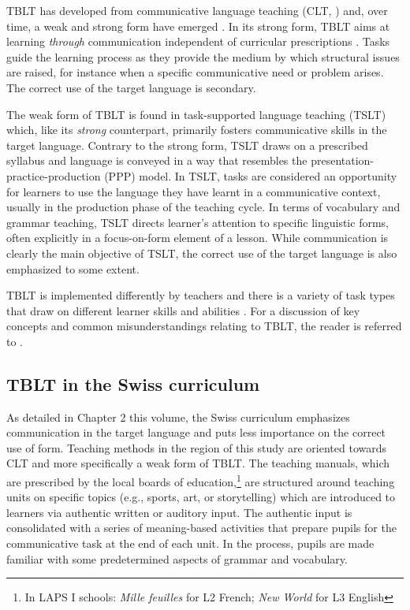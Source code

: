 \documentclass[output=paper]{langsci/langscibook}
\begin{document}
TBLT has developed from communicative language teaching (CLT, \citealt{Krashen1981}) and, over time, a weak and strong form have emerged \citep[109]{Ellis2017}. In its strong form, TBLT aims at learning \textit{through} communication independent of curricular prescriptions \citep{Ellis2017}. Tasks guide the learning process as they provide the medium by which structural issues are raised, for instance when a specific communicative need or problem arises. The correct use of the target language is secondary.

The weak form of TBLT is found in task-supported language teaching (TSLT) which, like its \textit{strong} counterpart, primarily fosters communicative skills in the target language. Contrary to the strong form, TSLT draws on a prescribed syllabus and language is conveyed in a way that resembles the presentation-practice-production (PPP) model. In TSLT, tasks are considered an opportunity for learners to use the language they have learnt in a communicative context, usually in the production phase of the teaching cycle. In terms of vocabulary and grammar teaching, TSLT directs learner’s attention to specific linguistic forms, often explicitly in a focus-on-form element of a lesson. While communication is clearly the main objective of TSLT, the correct use of the target language is also emphasized to some extent. 

TBLT is implemented differently by teachers \citep{Ellis2009} and there is a variety of task types that draw on different learner skills and abilities \citep{Skehan1996}. For a discussion of key concepts and common misunderstandings relating to TBLT, the reader is referred to \citet{Ellis2009}.  

\subsection{TBLT in the Swiss curriculum}\label{sec:06:2.4}

As detailed in Chapter 2 this volume, the Swiss curriculum emphasizes communication in the target language and puts less importance on the correct use of form. Teaching methods in the region of this study are oriented towards CLT and more specifically a weak form of TBLT. The teaching manuals, which are prescribed by the local boards of education,\footnote{In LAPS I schools: \textit{Mille feuilles} \citep{BertschyEtAl2012} for L2 French; \textit{New World} \citep{ArnetClarkEtAl2013} for L3 English} are structured around teaching units on specific topics (e.g., sports, art, or storytelling) which are introduced to learners via authentic written or auditory input. The authentic input is consolidated with a series of meaning-based activities that prepare pupils for the communicative task at the end of each unit. In the process, pupils are made familiar with some predetermined aspects of grammar and vocabulary. 
\end{document}
